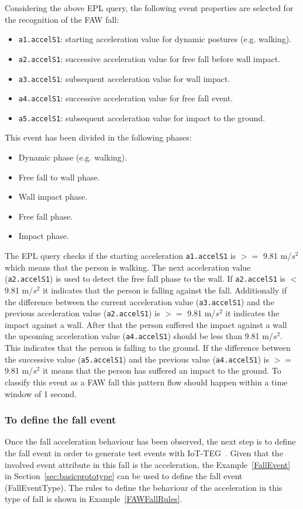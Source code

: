 \documentclass[review]{elsarticle}
\begin{document}
Considering the above EPL query, the following event properties are selected for the recognition of the FAW fall:

\begin{itemize}
  \item \texttt{a1.accelS1}: starting acceleration value for dynamic postures (e.g. walking).
  \item \texttt{a2.accelS1}: successive acceleration value for free fall before wall impact.
  \item \texttt{a3.accelS1}: subsequent acceleration value for wall impact.
  \item \texttt{a4.accelS1}: successive acceleration value for free fall event.
  \item \texttt{a5.accelS1}: subsequent acceleration value for impact to the ground.
\end{itemize}

This event has been divided in the following phases:
\begin{itemize}
  \item Dynamic phase (e.g. walking).
  \item Free fall to wall phase.
  \item Wall impact phase.
  \item Free fall phase.
  \item Impact phase.
\end{itemize}

The EPL query checks if the starting acceleration \texttt{a1.accelS1} is $>=$ 9.81 m/$s^2$ which means that the person is walking. 
The next acceleration value (\texttt{a2.accelS1}) is used to detect the free fall phase to the wall. If \texttt{a2.accelS1} 
is $<$ 9.81 m/$s^2$ it indicates that the person is falling against the fall. Additionally if the difference between 
the current acceleration value (\texttt{a3.accelS1}) and the previous acceleration value (\texttt{a2.accelS1}) is $>=$ 9.81 m/$s^2$ 
it indicates the impact against a wall. After that the person suffered the impact against a wall the upcoming 
acceleration value (\texttt{a4.accelS1}) should be less than 9.81 m/$s^2$. This indicates that the person is falling to 
the ground. If the difference between the successive value (\texttt{a5.accelS1}) and the previous value (\texttt{a4.accelS1}) 
is $>=$ 9.81 m/$s^2$ it means that the person has suffered an impact to the ground. To classify this event as 
a FAW fall this pattern flow should happen within a time window of 1 second.

\subsubsection*{To define the fall event} Once the fall acceleration behaviour has been observed, the next step is to define the 
fall event in order to generate test events with IoT-TEG~\cite{TesisGutierrez2017,Gutierrez2017}. Given that the involved event 
attribute in this fall is the acceleration, the Example~\ref{FallEvent} in Section~\ref{sec:basicprototype} can be used to define 
the fall event (FallEventType). The rules to define the behaviour of the acceleration in this type of fall is shown in 
Example~\ref{FAWFallRules}.
\end{document}
